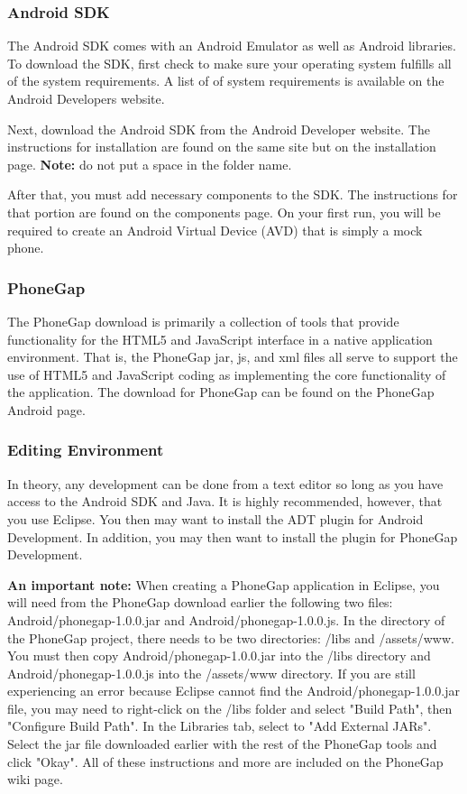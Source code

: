 \documentclass[12pt]{article}
\begin{document}
\begin{itemize}
\subsubsection{Android SDK}
The Android SDK comes with an Android Emulator as well as Android libraries.
To download the SDK, first check to make sure your operating system fulfills all of the system requirements.  A list of of system requirements is available on the Android Developers website\cite{AndroidSDK-SystemRequirements}.

Next, download the Android SDK from the Android Developer website\cite{AndroidSDK-Download}.
The instructions for installation are found on the same site but on the installation page\cite{AndroidSDK-Installation}. \textbf{Note:} do not put a space in the folder name.

After that, you must add necessary components to the SDK.  The instructions for that portion are found on the components page\cite{AndroidSDK-Components}.  On your first run, you will be required to create an Android Virtual Device (AVD) that is simply a mock phone.


\subsubsection{PhoneGap}
The PhoneGap download is primarily a collection of tools that provide functionality for the HTML5 and JavaScript interface in a native application environment.  That is, the PhoneGap jar, js, and xml files all serve to support the use of HTML5 and JavaScript coding as implementing the core functionality of the application.  The download for PhoneGap can be found on the PhoneGap Android page\cite{PhoneGap-Android}.


\subsubsection{Editing Environment}
In theory, any development can be done from a text editor so long as you have access to the Android SDK and Java.  It is highly recommended, however, that you use Eclipse\cite{Eclipse-Helios}.  You then may want to install the ADT plugin for Android Development\cite{Eclipse-ADT}.  In addition, you may then want to install the plugin for PhoneGap Development\cite{PhoneGap-Eclipse}.

\textbf{An important note:} When creating a PhoneGap application in Eclipse, you will need from the PhoneGap download earlier the following two files: Android/phonegap-1.0.0.jar and Android/phonegap-1.0.0.js.  In the directory of the PhoneGap project, there needs to be two directories: /libs and /assets/www.  You must then copy Android/phonegap-1.0.0.jar into the /libs directory and Android/phonegap-1.0.0.js into the /assets/www directory.  If you are still experiencing an error because Eclipse cannot find the Android/phonegap-1.0.0.jar file, you may need to right-click on the /libs folder and select "Build Path", then "Configure Build Path".  In the Libraries tab, select to "Add External JARs".  Select the jar file downloaded earlier with the rest of the PhoneGap tools and click "Okay". All of these instructions and more are included on the PhoneGap wiki page\cite{Wiki-PhoneGap-Eclipse}.


\end{itemize}
\end{document}
